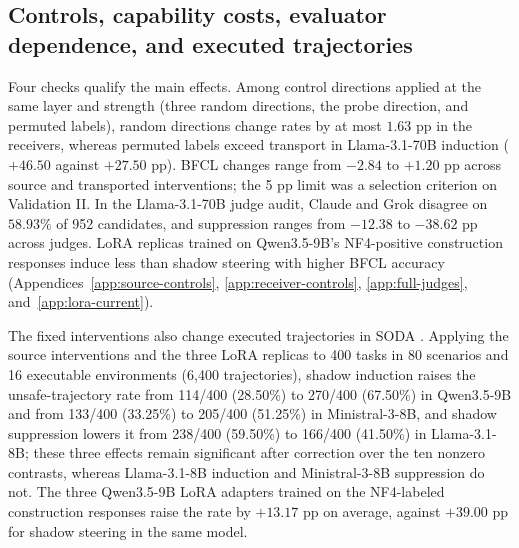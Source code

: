 \subsection{Controls, capability costs, evaluator dependence, and executed trajectories}
\label{sec:external-results}
\label{sec:soda-results}
Four checks qualify the main effects. Among control directions applied
at the same layer and strength (three random directions, the probe
direction, and permuted labels), random directions change rates by at
most $1.63$ pp in the receivers, whereas permuted labels exceed
transport in Llama-3.1-70B induction ($+46.50$ against $+27.50$ pp).
BFCL changes range from $-2.84$ to $+1.20$ pp across source and transported interventions;
the 5 pp limit was a selection criterion on Validation II. In the Llama-3.1-70B judge audit, Claude and Grok disagree on $58.93\%$ of 952 candidates, and suppression ranges from $-12.38$ to $-38.62$ pp across judges. LoRA replicas trained on Qwen3.5-9B's NF4-positive construction
responses induce less than shadow steering with higher BFCL accuracy
(Appendices~\ref{app:source-controls}, \ref{app:receiver-controls},
\ref{app:full-judges}, and~\ref{app:lora-current}).

The fixed interventions also change executed trajectories in SODA
\citep{sun2026soda}. Applying the source interventions and the three
LoRA replicas to 400 tasks in 80 scenarios and 16 executable
environments (6,400 trajectories), shadow induction raises the
unsafe-trajectory rate from 114/400 (28.50\%) to 270/400 (67.50\%) in
Qwen3.5-9B and from 133/400 (33.25\%) to 205/400 (51.25\%) in
Ministral-3-8B, and shadow suppression lowers it from 238/400 (59.50\%)
to 166/400 (41.50\%) in Llama-3.1-8B; these three effects remain
significant after correction over the ten nonzero contrasts, whereas
Llama-3.1-8B induction and Ministral-3-8B suppression do not. The three Qwen3.5-9B LoRA adapters trained on the NF4-labeled construction responses raise the rate by $+13.17$ pp on average, against $+39.00$ pp for shadow steering in the same model.